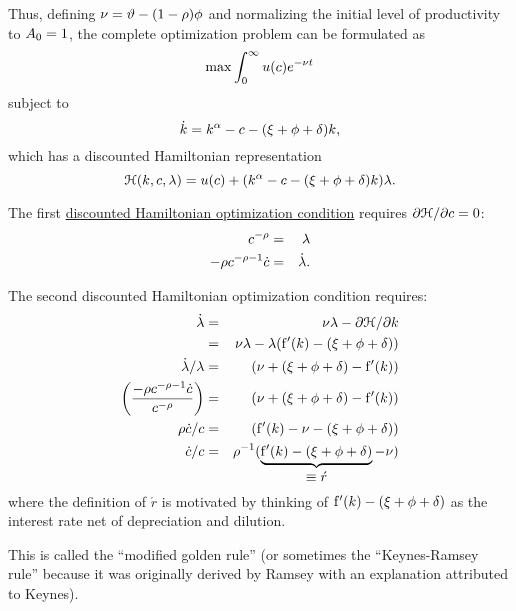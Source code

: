 \documentclass{handout}
\begin{document}
Thus, defining $\nu = \vartheta  - (1-\rho) \phi$ and normalizing the initial
level of productivity to $A _{0}=1$, the complete optimization problem
can be formulated as
\begin{equation}
  \max \int_{0}^{\infty} u(c) e^{-\nu  t}
\end{equation}
subject to
\begin{equation}
  \dot{{k}} = {k}^{\alpha}-c-(\xi+\phi+\delta)k,
\end{equation}
which has a discounted Hamiltonian representation
\begin{equation}
  \mathcal{H}({k},c,\lambda) = u(c) + ({k}^{\alpha} - c - (\xi+\phi+\delta){k})\lambda.
\end{equation}

The first \href{https://en.wikipedia.org/wiki/Hamiltonian_(control_theory)}{discounted Hamiltonian optimization condition} requires $\partial 
\mathcal{H}/\partial c = 0$:
\begin{eqnarray}
  c^{-\rho} & = & \lambda  \label{eq:H1A} \\
  -\rho c^{-\rho-1}\dot{c} & = & \dot{\lambda} 
                                       .
\end{eqnarray}

The second discounted Hamiltonian optimization condition requires:
\begin{eqnarray}
  \dot{\lambda} & = & \nu\lambda - \partial \mathcal{H}/\partial {k}  \\
                & = & \nu\lambda - \lambda (\mathrm{f}^{\prime}({k}) - (\xi+\phi+\delta))  \\
  \dot{\lambda}/{\lambda} & = & (\nu+(\xi+\phi+\delta)-\mathrm{f}^{\prime}({k}))
  \\  \left(\frac{-\rho c^{-\rho-1}\dot{c}}{c^{-\rho}}\right) & = & (\nu+(\xi+\phi+\delta)-\mathrm{f}^{\prime}({k}))
  \\  \rho \dot{c}/c & = & (\mathrm{f}^{\prime}({k})-\nu-(\xi+\phi+\delta))
  \\  \dot{c}/c  & = & \rho^{-1}(\underbrace{\mathrm{f}^{\prime}({k})-(\xi+\phi+\delta)}_{\mbox{$\equiv \acute{r}$}}-\nu)
\end{eqnarray}
where the definition of $\acute{r}$ is motivated by thinking of 
$\mathrm{f}^{\prime}({k})-(\xi+\phi+\delta)$ as the interest rate net of depreciation and
dilution.  

This is called the ``modified golden rule'' (or sometimes the 
``Keynes-Ramsey rule'' because it was originally derived by 
Ramsey with an explanation attributed to Keynes).  
\end{document}

